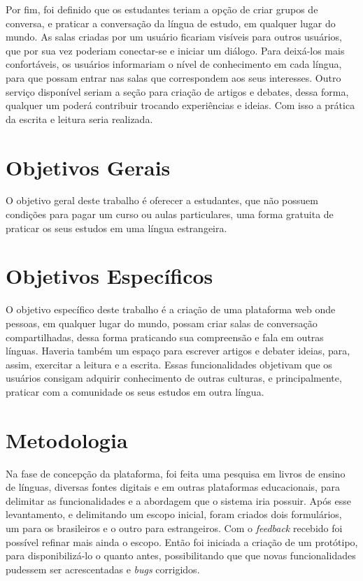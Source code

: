 Por fim, foi definido que os estudantes teriam a opção de criar grupos de conversa, e praticar a conversação da língua de estudo, em qualquer lugar do mundo. As salas criadas por um usuário ficariam visíveis para outros usuários, que por sua vez poderiam conectar-se e iniciar um diálogo. Para deixá-los mais confortáveis, os usuários informariam o nível de conhecimento em cada língua, para que possam entrar nas salas que correspondem aos seus interesses. Outro serviço disponível seriam a seção para criação de artigos e debates, dessa forma, qualquer um poderá contribuir trocando experiências e ideias. Com isso a prática da escrita e leitura seria realizada.


\section{Objetivos Gerais}

O objetivo geral deste trabalho é oferecer a estudantes, que não possuem condições para pagar um curso ou aulas particulares, uma forma gratuita de praticar os seus estudos em uma língua estrangeira.

\section{Objetivos Específicos}

O objetivo específico deste trabalho é a criação de uma plataforma web onde pessoas, em qualquer lugar do mundo, possam criar salas de conversação compartilhadas, dessa forma praticando sua compreensão e fala em outras línguas. Haveria também um espaço para escrever artigos e debater ideias, para, assim, exercitar a leitura e a escrita. Essas funcionalidades objetivam que os usuários consigam adquirir conhecimento de outras culturas, e principalmente, praticar com a comunidade os seus estudos em outra língua.

\section{Metodologia}

Na fase de concepção da plataforma, foi feita uma pesquisa em livros de ensino de línguas, diversas fontes digitais e em outras plataformas educacionais, para delimitar as funcionalidades e a abordagem que o sistema iria possuir. Após esse levantamento, e delimitando um escopo inicial, foram criados dois formulários, um para os brasileiros e o outro para estrangeiros. Com o \textit{feedback} recebido foi possível refinar mais ainda o escopo. Então foi iniciada a criação de um protótipo, para disponibilizá-lo o quanto antes, possibilitando que que novas funcionalidades pudessem ser acrescentadas e \textit{bugs} corrigidos.

